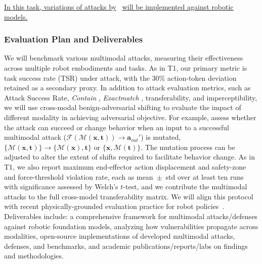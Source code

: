 \ul{In this task, variations of attacks by}~{\cite{qi2024visual,walmer2022dual}} \ul{will be implemented against robotic models.}



\subsubsection{Evaluation Plan and Deliverables} \label{sec:t2_evaluation}

We will benchmark various multimodal attacks, measuring their effectiveness across multiple robot embodiments and tasks. As in T1, our primary metric is task success rate (TSR) under attack, with the 30\% action-token deviation retained as a secondary proxy.
In addition to attack evaluation metrics, such as Attack Success Rate, 
\textit{Contain} \cite{lu2024test}, \textit{Exactmatch} \cite{luo2024image,lu2024test}, transferability, and imperceptibility, we will use cross-modal benign-adversarial shifting to evaluate the impact of different modality in achieving adversarial objective.
For example, assess whether the attack can succeed or change behavior when an input to a successful multimodal attack (\ie $\mathcal{F}(\mathcal{M}(\bm{x},\bm{t}))\rightarrow\bm{a}_{out}'$) is mutated, \eg $\{\mathcal{M}(\bm{x},\bm{t})\} \rightarrow\{\mathcal{M}(\bm{x}),\bm{t}\}$ or $\{\bm{x},\mathcal{M}(\bm{t})\}$.
The mutation process can be adjusted to alter the extent of shifts required to facilitate behavior change.
As in T1, we also report maximum end-effector action displacement and safety-zone and force-threshold violation rate, each as mean~$\pm$~std over at least ten runs with significance assessed by Welch's $t$-test, and we contribute the multimodal attacks to the full cross-model transferability matrix.
We will align this protocol with recent physically-grounded evaluation practice for robot policies~\cite{sun2026maniparena}.
Deliverables include:  a comprehensive framework for multimodal attacks/defenses against robotic foundation models, analyzing how vulnerabilities propagate across modalities,  open-source implementations of developed multimodal attacks, defenses, and benchmarks, and  academic publications/reports/labs on findings and methodologies.

